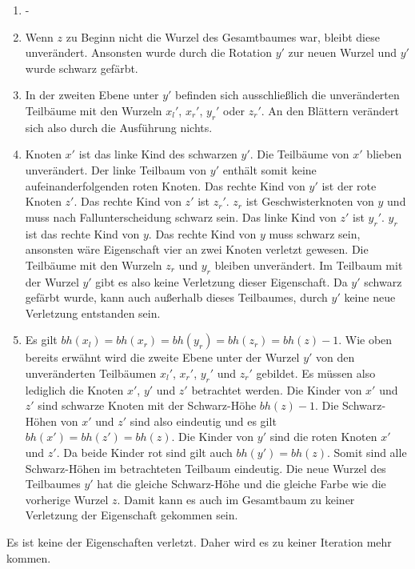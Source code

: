 \documentclass[a4paper,12pt]{article}
\begin{document}
\begin{enumerate}
	\item -
	\item Wenn $z$ zu Beginn nicht die Wurzel des Gesamtbaumes war, bleibt diese unverändert. Ansonsten wurde durch die Rotation $y'$ zur neuen Wurzel und $y'$ wurde schwarz gefärbt. 
	\item  In der zweiten Ebene unter $y'$ befinden sich ausschließlich die unveränderten Teilbäume mit den Wurzeln ${x_l}'$, ${x_r}'$, ${y_r}'$ oder ${z_r}'$. An den Blättern verändert sich also durch die Ausführung nichts.
	\item  Knoten $x'$ ist das linke Kind des schwarzen $y'$. Die Teilbäume von $x'$ blieben unverändert. Der linke Teilbaum von $y'$ enthält somit keine aufeinanderfolgenden roten Knoten. Das rechte Kind von $y'$ ist der rote Knoten $z'$. Das rechte Kind von $z'$ ist ${z_r}'$.  ${z_r}$ ist Geschwisterknoten von $y$ und muss nach Fallunterscheidung schwarz sein. Das linke Kind von $z'$ ist ${y_r}'$. ${y_r}$ ist das rechte Kind von $y$. Das rechte Kind von $y$ muss schwarz sein, ansonsten wäre Eigenschaft vier an zwei Knoten verletzt gewesen. Die Teilbäume mit den Wurzeln ${z_r}$ und  ${y_r}$ bleiben unverändert. Im Teilbaum mit der Wurzel $y'$ gibt es also keine Verletzung dieser Eigenschaft. Da $y'$ schwarz gefärbt wurde, kann auch außerhalb dieses Teilbaumes, durch $y'$ keine neue Verletzung entstanden sein.
	\item  Es gilt  $\mathit{bh(x_l)} = \mathit{bh(x_r)} = \mathit{bh(y_r)} =  \mathit{bh(z_r)} = \mathit{bh(z)} - 1$. Wie oben bereits erwähnt wird die zweite Ebene unter der Wurzel $y'$ von den unveränderten Teilbäumen ${x_l}'$, ${x_r}'$, ${y_r}'$ und ${z_r}'$ gebildet. Es müssen also lediglich die Knoten $x'$, $y'$ und $z'$ betrachtet werden. Die Kinder von $x'$ und $z'$ sind schwarze Knoten mit der Schwarz-Höhe $\mathit{bh(z)} - 1$. Die Schwarz-Höhen von $x'$ und $z'$ sind also eindeutig und es gilt \mbox{$\mathit{bh(x')} = \mathit{bh(z')} = \mathit{bh(z)}$}. Die Kinder von $y'$ sind die roten Knoten $x'$ und $z'$. Da beide Kinder rot sind gilt auch  $\mathit{bh(y')}  = \mathit{bh(z)}$. Somit sind alle Schwarz-Höhen im betrachteten Teilbaum eindeutig. Die neue Wurzel des Teilbaumes $y'$ hat die gleiche Schwarz-Höhe und die gleiche Farbe wie die vorherige Wurzel $z$. Damit kann es auch im Gesamtbaum zu keiner Verletzung der Eigenschaft gekommen sein.
\end{enumerate} 

\noindent Es ist keine der Eigenschaften verletzt. Daher wird es zu keiner Iteration mehr kommen.
\end{document}
